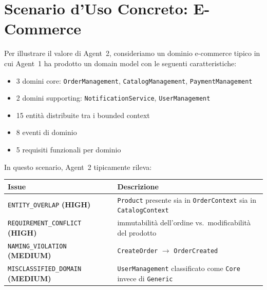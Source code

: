\documentclass[12pt,a4paper]{report}
\begin{document}
\section{Scenario d'Uso Concreto: E-Commerce}

Per illustrare il valore di Agent~2, consideriamo un dominio e-commerce tipico
in cui Agent~1 ha prodotto un domain model con le seguenti caratteristiche:

\begin{itemize}
\item 3 domini core: \texttt{OrderManagement}, \texttt{CatalogManagement},
        \texttt{PaymentManagement}
  \item 2 domini supporting: \texttt{NotificationService}, \texttt{UserManagement}
  \item 15 entità distribuite tra i bounded context
  \item 8 eventi di dominio
  \item 5 requisiti funzionali per dominio
\end{itemize}

In questo scenario, Agent~2 tipicamente rileva:

\begin{table}[H]
\centering
\small
\renewcommand{\arraystretch}{1.5}
\setlength{\tabcolsep}{6pt}

\begin{tabularx}{\textwidth}{
  >{\raggedright\arraybackslash}p{8.0cm}
  >{\raggedright\arraybackslash}X
}
\toprule
\textbf{Issue} & \textbf{Descrizione} \\
\midrule

\texttt{ENTITY\_OVERLAP} \textbf{(HIGH)}
& \texttt{Product} presente sia in \texttt{OrderContext} sia in \texttt{CatalogContext} \\

\texttt{REQUIREMENT\_CONFLICT} \textbf{(HIGH)}
& immutabilità dell'ordine vs.\ modificabilità del prodotto \\

\texttt{NAMING\_VIOLATION} \textbf{(MEDIUM)}
& \texttt{CreateOrder} $\rightarrow$ \texttt{OrderCreated} \\

\texttt{MISCLASSIFIED\_DOMAIN} \textbf{(MEDIUM)}
& \texttt{UserManagement} classificato come \texttt{Core} invece di \texttt{Generic} \\

\bottomrule
\end{tabularx}
\end{table}
\end{document}
